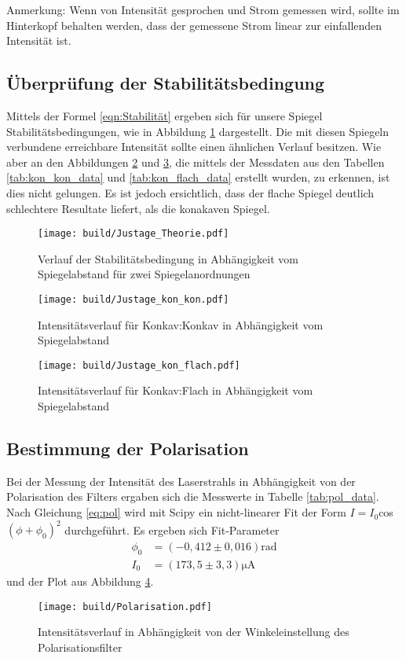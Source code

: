 Anmerkung: Wenn von Intensität gesprochen und Strom gemessen wird, sollte im Hinterkopf behalten werden, dass der gemessene Strom linear zur einfallenden Intensität ist.

\subsection{Überprüfung der Stabilitätsbedingung}
Mittels der Formel \eqref{eqn:Stabilität} ergeben sich für unsere Spiegel Stabilitätsbedingungen, wie in Abbildung \ref{fig:Stabilität_Theorie} dargestellt. 
Die mit diesen Spiegeln verbundene erreichbare Intensität sollte einen ähnlichen Verlauf besitzen.
Wie aber an den Abbildungen \ref{fig:Stabilität_kon_kon} und \ref{fig:Stabilität_kon_flach}, die mittels der Messdaten aus den Tabellen
\ref{tab:kon_kon_data} und \ref{tab:kon_flach_data} erstellt wurden, zu erkennen, ist dies nicht gelungen.
Es ist jedoch ersichtlich, dass der flache Spiegel deutlich schlechtere Resultate liefert, als die konakaven Spiegel.

\begin{figure}
  \centering
  \texttt{[image: build/Justage\_Theorie.pdf]}
  \caption{Verlauf der Stabilitätsbedingung in Abhängigkeit vom Spiegelabstand für zwei Spiegelanordnungen}
  \label{fig:Stabilität_Theorie}
\end{figure}


\begin{figure}
  \centering
  \texttt{[image: build/Justage\_kon\_kon.pdf]}
  \caption{Intensitätsverlauf für Konkav:Konkav in Abhängigkeit vom Spiegelabstand}
  \label{fig:Stabilität_kon_kon}
\end{figure}

\begin{figure}
  \centering
  \texttt{[image: build/Justage\_kon\_flach.pdf]}
  \caption{Intensitätsverlauf für Konkav:Flach in Abhängigkeit vom Spiegelabstand}
  \label{fig:Stabilität_kon_flach}
\end{figure}

\subsection{Bestimmung der Polarisation}
Bei der Messung der Intensität des Laserstrahls in Abhängigkeit von der Polarisation des Filters ergaben sich die
Messwerte in Tabelle \ref{tab:pol_data}.
Nach Gleichung \ref{eq:pol} wird mit Scipy \cite{scipy} ein nicht-linearer Fit der Form $I = I_0$cos$(\phi+\phi_0)^2$ durchgeführt.
Es ergeben sich Fit-Parameter
\begin{align}
  \phi_0&=(-0,412\pm 0,016)\si{\radian}\nonumber\\
  I_0&=(173,5\pm 3,3)\si{\micro\ampere}\label{eqn:Parameter_Polarisation}
\end{align}
und der Plot aus Abbildung \ref{fig:Polarisation}.
\begin{figure}
  \centering
  \texttt{[image: build/Polarisation.pdf]}
  \caption{Intensitätsverlauf in Abhängigkeit von der Winkeleinstellung des Polarisationsfilter}
  \label{fig:Polarisation}
\end{figure}

